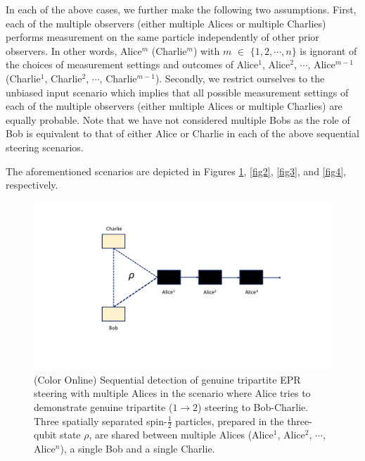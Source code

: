 \documentclass[pra,a4paper,aps,twocolumn,showpacs,superscriptaddress,groupedaddress]{revtex4}
\begin{document}
In each of the above cases, we further make the following two assumptions.
First, each of the multiple observers (either multiple Alices or multiple Charlies)  performs measurement on the same particle independently of other prior observers. In other words, Alice$^m$ (Charlie$^m$) with $m$ $\in$ $\{1, 2, \cdots, n\}$ is ignorant of the choices of measurement settings and outcomes of Alice$^1$, Alice$^2$, $\cdots$, Alice$^{m-1}$ (Charlie$^1$, Charlie$^2$, $\cdots$, Charlie$^{m-1}$). Secondly, we restrict ourselves to the unbiased input scenario which implies that  all possible measurement settings of each of the multiple observers (either multiple Alices or multiple Charlies) are equally probable. 
 Note that we have not considered multiple Bobs as the role of Bob is equivalent to that of either Alice or Charlie in each of the above sequential steering scenarios.




The aforementioned scenarios are depicted in Figures \ref{fig1}, \ref{fig2}, \ref{fig3}, and \ref{fig4}, respectively. 

\begin{figure}[t!]
\centering
\includegraphics[scale=0.4]{Untrusted1SDI.pdf}
\caption{(Color Online) Sequential detection of genuine tripartite EPR steering with multiple Alices in the scenario where Alice tries to demonstrate genuine tripartite ($1 \rightarrow 2$) steering to Bob-Charlie. Three spatially separated spin-$\frac{1}{2}$ particles,  prepared in the three-qubit state $\rho$,  are shared between multiple Alices (Alice$^1$, Alice$^2$, $\cdots$, Alice$^n$), a single Bob and a single Charlie. }
\label{fig1}
\end{figure}
\end{document}
